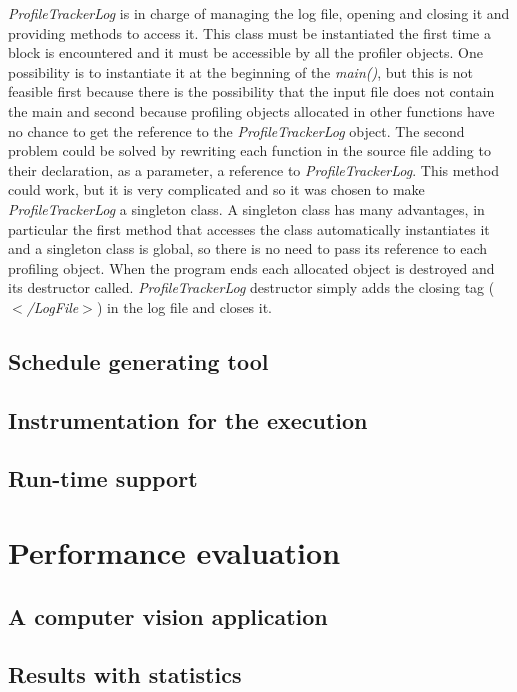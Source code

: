 \documentclass[a4paper,11pt,oneside]{book}
\begin{document}
\emph{ProfileTrackerLog} is in charge of managing the log file, opening and closing it and providing methods to access it. This class must be instantiated the first time a block is encountered and it must be accessible by all the profiler objects. One possibility is to instantiate it at the beginning of the \emph{main()}, but this is not feasible first because there is the possibility that the input file does not contain the main and second because profiling objects allocated in other functions have no chance to get the reference to the \emph{ProfileTrackerLog} object. The second problem could be solved by rewriting each function in the source file adding to their declaration, as a parameter, a reference to \emph{ProfileTrackerLog}. This method could work, but it is very complicated and so it was chosen to make \emph{ProfileTrackerLog} a singleton class. A singleton class has many advantages, in particular the first method that accesses the class automatically instantiates it and a singleton class is global, so there is no need to pass its reference to each profiling object. When the program ends each allocated object is destroyed and its destructor called. \emph{ProfileTrackerLog} destructor simply adds the closing tag (\emph{$<$/LogFile$>$}) in the log file and closes it.



\section{Schedule generating tool}
\section{Instrumentation for the execution}
\section{Run-time support}

\chapter{Performance evaluation}
\section{A computer vision application}
\section{Results with statistics}
\end{document}
